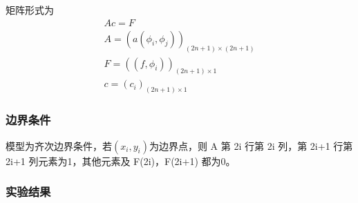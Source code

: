 \documentclass[a4paper,UTF8,titlepage]{ctexart}
\begin{document}
矩阵形式为
$$
\begin{matrix}
	A c = F \\
	A = (a(\phi_i, \phi_j))_{(2n+1) \times (2n+1)} \\
	F = ((f,\phi_i))_{(2n+1) \times 1} \\
	c = (c_i)_{(2n+1) \times 1}
\end{matrix}
$$

%
%

\subsubsection{边界条件}

模型为齐次边界条件，若$(x_i,y_i)$为边界点，则 A 第 2i 行第 2i 列，第 2i+1 行第 2i+1 列元素为1，其他元素及  F(2i)，F(2i+1) 都为0。


%
%

\subsubsection{实验结果}
\end{document}
